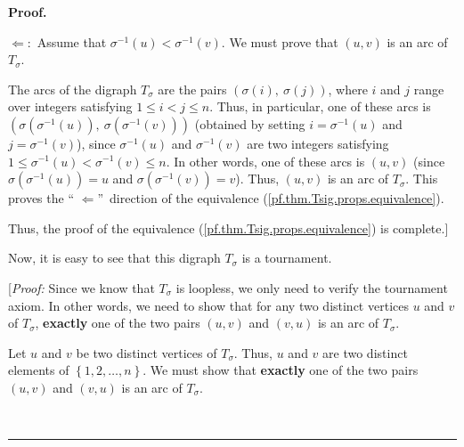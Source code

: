 \documentclass[numbers=enddot,12pt,final,onecolumn,notitlepage]{scrartcl}%
\numberwithin{exer}{subsection}
\theoremstyle{definition}
\newenvironment{fineprint}{\begin{small}}{\end{small}}
\newenvironment{proof}[1][Proof]{\noindent\textbf{#1.} }{\ \rule{0.5em}{0.5em}}
\begin{document}
\begin{proof}
\begin{fineprint}
$\Longleftarrow:$ Assume that $\sigma^{-1}\left(  u\right)  <\sigma
^{-1}\left(  v\right)  $. We must prove that $\left(  u,v\right)  $ is an arc
of $T_{\sigma}$.

The arcs of the digraph $T_{\sigma}$ are the pairs $\left(  \sigma\left(
i\right)  ,\ \sigma\left(  j\right)  \right)  $, where $i$ and $j$ range over
integers satisfying $1\leq i<j\leq n$. Thus, in particular, one of these arcs
is $\left(  \sigma\left(  \sigma^{-1}\left(  u\right)  \right)  ,\ \sigma
\left(  \sigma^{-1}\left(  v\right)  \right)  \right)  $ (obtained by setting
$i=\sigma^{-1}\left(  u\right)  $ and $j=\sigma^{-1}\left(  v\right)  $),
since $\sigma^{-1}\left(  u\right)  $ and $\sigma^{-1}\left(  v\right)  $ are
two integers satisfying $1\leq\sigma^{-1}\left(  u\right)  <\sigma^{-1}\left(
v\right)  \leq n$. In other words, one of these arcs is $\left(  u,v\right)  $
(since $\sigma\left(  \sigma^{-1}\left(  u\right)  \right)  =u$ and
$\sigma\left(  \sigma^{-1}\left(  v\right)  \right)  =v$). Thus, $\left(
u,v\right)  $ is an arc of $T_{\sigma}$. This proves the \textquotedblleft%
$\Longleftarrow$\textquotedblright\ direction of the equivalence
(\ref{pf.thm.Tsig.props.equivalence}).

Thus, the proof of the equivalence (\ref{pf.thm.Tsig.props.equivalence}) is
complete.] \medskip
\end{fineprint}

Now, it is easy to see that this digraph $T_{\sigma}$ is a tournament.

\begin{fineprint}
[\textit{Proof:} Since we know that $T_{\sigma}$ is loopless, we only need to
verify the tournament axiom. In other words, we need to show that for any two
distinct vertices $u$ and $v$ of $T_{\sigma}$, \textbf{exactly} one of the two
pairs $\left(  u,v\right)  $ and $\left(  v,u\right)  $ is an arc of
$T_{\sigma}$.

Let $u$ and $v$ be two distinct vertices of $T_{\sigma}$. Thus, $u$ and $v$
are two distinct elements of $\left\{  1,2,\ldots,n\right\}  $. We must show
that \textbf{exactly} one of the two pairs $\left(  u,v\right)  $ and $\left(
v,u\right)  $ is an arc of $T_{\sigma}$.


\end{fineprint}
\end{proof}
\end{document}
